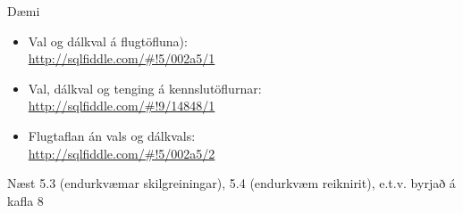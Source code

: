 \documentclass[handout]{beamer}
\begin{document}
\begin{frame}{Dæmi}
    \begin{itemize}
        \item Val og dálkval á flugtöfluna): \\ \url{http://sqlfiddle.com/\#!5/002a5/1}
        \item Val, dálkval og tenging á kennslutöflurnar: \\ \url{http://sqlfiddle.com/\#!9/14848/1}
        \item Flugtaflan án vals og dálkvals: \\ \url{http://sqlfiddle.com/\#!5/002a5/2}
    \end{itemize}
\end{frame}

\begin{frame}{Næst}
5.3 (endurkvæmar skilgreiningar), 5.4 (endurkvæm reiknirit), e.t.v. byrjað á kafla 8
\end{frame}
\end{document}
